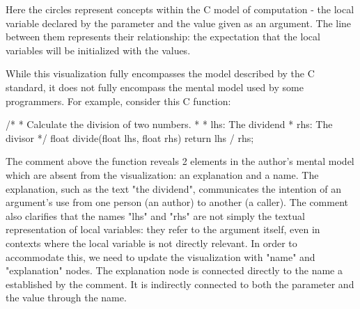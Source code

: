 
Here the circles represent concepts within the C model of computation - the local
variable declared by the parameter and the value given as an argument.
The line between them represents their relationship: the expectation that the local
variables will be initialized with the values.

While this visualization fully encompasses the model described by the C standard, it does
not fully encompass the mental model used by some programmers.
For example, consider this C function:

\begin{pygmented}[lang=c]
/*
 * Calculate the division of two numbers.
 *
 * lhs: The dividend
 * rhs: The divisor
 */
float divide(float lhs, float rhs) {
  return lhs / rhs;
}
\end{pygmented}

The comment above the function reveals 2 elements in the author's mental model which are
absent from the visualization: an explanation and a name.
The explanation, such as the text "the dividend", communicates the intention of an
argument's use from one person (an author) to another (a caller).
The comment also clarifies that the names "lhs" and "rhs" are not simply the textual
representation of local variables: they refer to the argument itself, even in contexts
where the local variable is not directly relevant.
In order to accommodate this, we need to update the visualization with "name" and
"explanation" nodes.
The explanation node is connected directly to the name a established by the comment.
It is indirectly connected to both the parameter and the value through the name.


